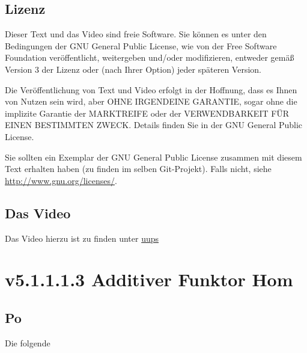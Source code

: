 \documentclass[a4paper]{amsart}
\theoremstyle{definition}
\begin{document}
\subsection*{Lizenz}
Dieser Text und das Video sind freie Software. Sie können es unter den Bedingungen der
GNU General Public License, wie von der Free Software Foundation veröffentlicht, weitergeben
und/oder modifizieren, entweder gemäß Version 3 der Lizenz oder (nach Ihrer Option) jeder späteren Version.

Die Veröffentlichung von Text und Video erfolgt in der Hoffnung, dass es Ihnen von Nutzen sein wird,
aber OHNE IRGENDEINE GARANTIE, sogar ohne die implizite Garantie der MARKTREIFE oder der
VERWENDBARKEIT FÜR EINEN BESTIMMTEN ZWECK. Details finden Sie in der GNU General Public License.

Sie sollten ein Exemplar der GNU General Public License zusammen mit diesem Text erhalten haben
(zu finden im selben Git-Projekt).
Falls nicht, siehe \url{http://www.gnu.org/licenses/}.

\subsection*{Das Video}
Das Video hierzu ist zu finden unter
{\tiny
   \url{uups}
}

\section{v5.1.1.1.3 Additiver Funktor Hom}

\subsection{Po}
Die folgende 
\end{document}
